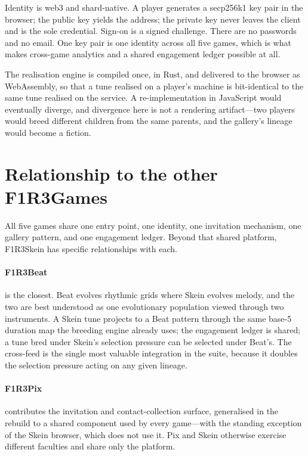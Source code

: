 \documentclass[11pt,a4paper]{article}
\theoremstyle{definition}
\theoremstyle{plain}
\begin{document}
Identity is web3 and shard-native. A player generates a secp256k1 key pair in the browser; the
public key yields the address; the private key never leaves the client and is the sole credential.
Sign-on is a signed challenge. There are no passwords and no email. One key pair is one identity
across all five games, which is what makes cross-game analytics and a shared engagement ledger
possible at all.

The realisation engine is compiled once, in Rust, and delivered to the browser as WebAssembly, so
that a tune realised on a player's machine is bit-identical to the same tune realised on the
service. A re-implementation in JavaScript would eventually diverge, and divergence here is not a
rendering artifact---two players would breed different children from the same parents, and the
gallery's lineage would become a fiction.

\section{Relationship to the other F1R3Games}

All five games share one entry point, one identity, one invitation mechanism, one gallery pattern,
and one engagement ledger. Beyond that shared platform, F1R3Skein has specific relationships with
each.

\paragraph{F1R3Beat} is the closest. Beat evolves rhythmic grids where Skein evolves melody, and the
two are best understood as one evolutionary population viewed through two instruments. A Skein tune
projects to a Beat pattern through the same base-5 duration map the breeding engine already uses;
the engagement ledger is shared; a tune bred under Skein's selection pressure can be selected under
Beat's. The cross-feed is the single most valuable integration in the suite, because it doubles the
selection pressure acting on any given lineage.

\paragraph{F1R3Pix} contributes the invitation and contact-collection surface, generalised in the
rebuild to a shared component used by every game---with the standing exception of the Skein browser,
which does not use it. Pix and Skein otherwise exercise different faculties and share only the
platform.
\end{document}
